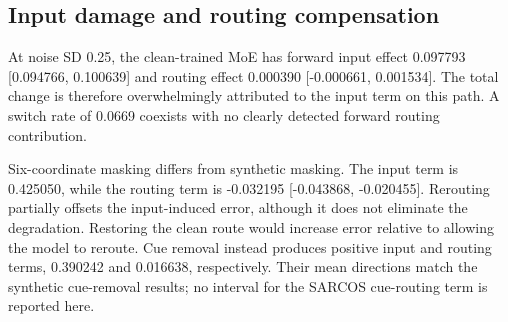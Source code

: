 \documentclass[10pt,letterpaper]{article}
\begin{document}
\begin{table}[!htbp]
\centering
\caption{SARCOS macro-NMSE averaged over five seeds. Noise has SD 0.25; masking removes six of 21 sensor coordinates. Switch is the expert-ID switch rate at noise SD 0.25. An em dash means the rate is undefined: a dense network has no expert router, so it has no expert identity to switch.}
\label{tab:results7}
\small
\setlength{\tabcolsep}{4pt}
\renewcommand{\arraystretch}{1.1}
\ifdim\wd\reporttablebox>\linewidth
\resizebox{\linewidth}{!}{\usebox{\reporttablebox}}
\else\usebox{\reporttablebox}\fi
\end{table}


\subsection{Input damage and routing compensation}

At noise SD 0.25, the clean-trained MoE has forward input effect 0.097793 [0.094766, 0.100639] and routing effect 0.000390 [-0.000661, 0.001534]. The total change is therefore overwhelmingly attributed to the input term on this path. A switch rate of 0.0669 coexists with no clearly detected forward routing contribution.


Six-coordinate masking differs from synthetic masking. The input term is 0.425050, while the routing term is -0.032195 [-0.043868, -0.020455]. Rerouting partially offsets the input-induced error, although it does not eliminate the degradation. Restoring the clean route would increase error relative to allowing the model to reroute. Cue removal instead produces positive input and routing terms, 0.390242 and 0.016638, respectively. Their mean directions match the synthetic cue-removal results; no interval for the SARCOS cue-routing term is reported here.
\end{document}
